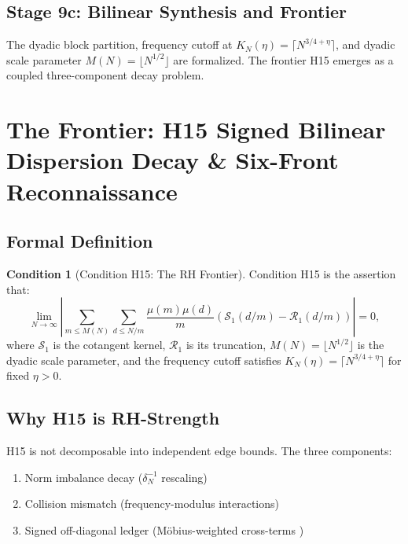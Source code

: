 \documentclass[11pt,a4paper]{article}
\theoremstyle{plain}
\theoremstyle{definition}
\newtheorem{condition}[theorem]{Condition}
\theoremstyle{remark}
\begin{document}
\subsection{Stage 9c: Bilinear Synthesis and Frontier}

The dyadic block partition, frequency cutoff at $K_N(\eta) = \lceil N^{3/4+\eta} \rceil$, and dyadic scale parameter $M(N) = \lfloor N^{1/2} \rfloor$ are formalized. The frontier H15 emerges as a coupled three-component decay problem.

\section{The Frontier: H15 Signed Bilinear Dispersion Decay \& Six-Front Reconnaissance}
\label{sec:frontier}

\subsection{Formal Definition}

\begin{condition}[Condition H15: The RH Frontier]\label{cond:h15}
Condition H15 is the assertion that:
\[
\lim_{N \to \infty} \left| \sum_{m \le M(N)} \sum_{d \le N/m} \frac{\mu(m)\mu(d)}{m} \left( \mathcal{S}_1(d/m) - \mathcal{R}_1(d/m) \right) \right| = 0,
\]
where $\mathcal{S}_1$ is the cotangent kernel, $\mathcal{R}_1$ is its truncation, $M(N) = \lfloor N^{1/2} \rfloor$ is the dyadic scale parameter, and the frequency cutoff satisfies $K_N(\eta) = \lceil N^{3/4+\eta} \rceil$ for fixed $\eta > 0$.
\end{condition}

\subsection{Why H15 is RH-Strength}

H15 is not decomposable into independent edge bounds. The three components:
\begin{enumerate}[label=(\roman*)]
  \item Norm imbalance decay ($\delta_N^{-1}$ rescaling)
  \item Collision mismatch (frequency-modulus interactions)
  \item Signed off-diagonal ledger (Möbius-weighted cross-terms \cite{MatomakiRadziwill2023})
\end{enumerate}
\end{document}
